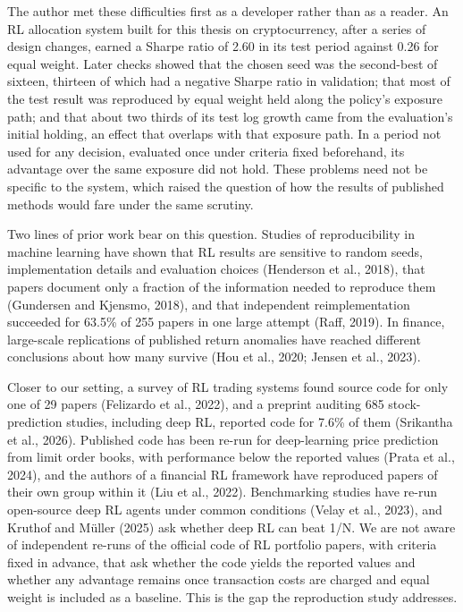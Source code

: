 \documentclass[12pt,a4paper]{report}
\begin{document}
The author met these difficulties first as a developer rather than as a
reader. An RL allocation system built for this thesis on cryptocurrency,
after a series of design changes, earned a Sharpe ratio of 2.60 in its
test period against 0.26 for equal weight. Later checks showed that the
chosen seed was the second-best of sixteen, thirteen of which had a
negative Sharpe ratio in validation; that most of the test result was
reproduced by equal weight held along the policy's exposure path; and
that about two thirds of its test log growth came from the evaluation's
initial holding, an effect that overlaps with that exposure path. In a
period not used for any decision, evaluated once under criteria fixed
beforehand, its advantage over the same exposure did not hold. These
problems need not be specific to the system, which raised the question
of how the results of published methods would fare under the same
scrutiny.

Two lines of prior work bear on this question. Studies of
reproducibility in machine learning have shown that RL results are
sensitive to random seeds, implementation details and evaluation choices
(Henderson et al., 2018), that papers document only a fraction of the
information needed to reproduce them (Gundersen and Kjensmo, 2018), and
that independent reimplementation succeeded for 63.5\% of 255 papers in
one large attempt (Raff, 2019). In finance, large-scale replications of
published return anomalies have reached different conclusions about how
many survive (Hou et al., 2020; Jensen et al., 2023).

Closer to our setting, a survey of RL trading systems found source code
for only one of 29 papers (Felizardo et al., 2022), and a preprint
auditing 685 stock-prediction studies, including deep RL, reported code
for 7.6\% of them (Srikantha et al., 2026). Published code has been
re-run for deep-learning price prediction from limit order books, with
performance below the reported values (Prata et al., 2024), and the
authors of a financial RL framework have reproduced papers of their own
group within it (Liu et al., 2022). Benchmarking studies have re-run
open-source deep RL agents under common conditions (Velay et al., 2023),
and Kruthof and Müller (2025) ask whether deep RL can beat 1/N. We are
not aware of independent re-runs of the official code of RL portfolio
papers, with criteria fixed in advance, that ask whether the code yields
the reported values and whether any advantage remains once transaction
costs are charged and equal weight is included as a baseline. This is
the gap the reproduction study addresses.
\end{document}
